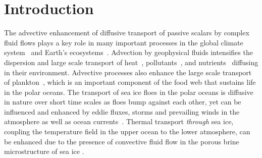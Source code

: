 \documentclass[english,12pt,jmp,graphicx]{revtex4-1}
\begin{document}
\maketitle %



\section{Introduction}\label{sec:Introduction}
%
The advective enhancement of diffusive transport of passive scalars by 
complex fluid flows plays a key role in many important processes in the global 
climate system~\cite{Washington:1986:9780935702521} and Earth's
ecosystems~\cite{Lorenzo:2013:26:4}. Advection by geophysical
fluids intensifies the dispersion and large scale transport of
heat~\cite{Moffatt:RPP:621},
pollutants~\cite{Samson:1988:88009978},
and nutrients~\cite{Lorenzo:2013:26:4,Hofmann:ANS:2004:265075} diffusing
in their environment. Advective processes also enhance the large scale
transport of plankton~\cite{Hofmann:ANS:2004:265075}, which is an
important component of the food web that sustains life in the polar
oceans.  The transport of sea ice floes in the polar oceans 
is diffusive in nature over short time scales as floes bump 
against each other, yet can be influenced and enhanced by eddie fluxes,
storms and prevailing winds in the atmosphere as well as ocean 
currents~\cite{Watanabe:2009JPO4010,Rampal:2008:JGRC10653,%
Rampal:2009:JGRC11312,Lukovich:2011:JGRC12087,Washington:1986:9780935702521}. 
Thermal transport \textit{through} sea ice, coupling the temperature field
in the upper ocean to the lower atmosphere, can be enhanced 
due to the presence of convective fluid flow in the porous brine microstructure
of sea ice \cite{Lytle:JGR-8853,trodahl2001thermal,Golden:GRL:L16501,Kraitzman_MMS_2019}.

\end{document}
